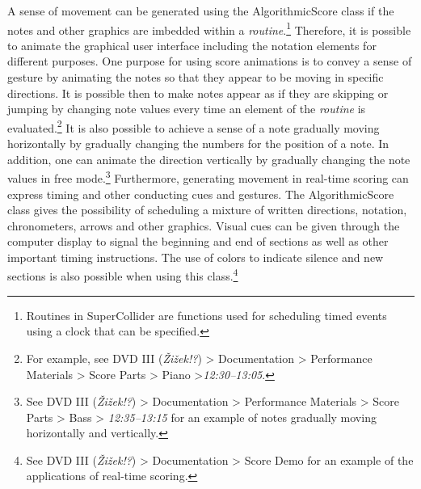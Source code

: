 \hypertarget{algoanimation}{}
A sense of movement can be generated using the AlgorithmicScore class if the notes and other graphics are imbedded within a \emph{routine}.\footnote{Routines in SuperCollider are functions used for scheduling timed events using a clock that can be specified.} Therefore, it is possible to animate the graphical user interface including the notation elements for different purposes. One purpose for using score animations is to convey a sense of gesture by animating the notes so that they appear to be moving in specific directions. It is possible then to make notes appear as if they are skipping or jumping by changing note values every time an element of the \emph{routine} is evaluated.\footnote{For example, see DVD III (\emph{\v{Z}i\v{z}ek!?}) \tiny \textgreater \footnotesize \hspace{0pt} Documentation \tiny \textgreater \footnotesize \hspace{0pt} Performance Materials \tiny \textgreater \footnotesize \hspace{0pt} Score Parts \tiny \textgreater \footnotesize \hspace{0pt} Piano \tiny \textgreater \footnotesize \hspace{0pt}\mbox{\emph{12:30--13:05}}.} It is also possible to achieve a sense of a note gradually moving horizontally by gradually changing the numbers for the position of a note. In addition, one can animate the direction vertically by gradually changing the note values in free mode.\footnote{See DVD III (\emph{\v{Z}i\v{z}ek!?}) \tiny \textgreater \footnotesize \hspace{0pt} Documentation \tiny \textgreater \footnotesize \hspace{0pt} Performance Materials \tiny \textgreater \footnotesize \hspace{0pt} Score Parts \tiny \textgreater \footnotesize \hspace{0pt} Bass \tiny \textgreater \footnotesize \hspace{0pt} \mbox{\emph{12:35--13:15}} for an example of notes gradually moving horizontally and vertically.} Furthermore, generating movement in real-time scoring can express timing and other conducting cues and gestures. The AlgorithmicScore class gives the possibility of scheduling a mixture of written directions, notation, chronometers, arrows and other graphics.  Visual cues can be given through the computer display to signal the beginning and end of sections as well as other important timing instructions. The use of colors to indicate silence and new sections is also possible when using this class.\footnote{See DVD III (\emph{\v{Z}i\v{z}ek!?}) \tiny \textgreater \footnotesize \hspace{0pt} Documentation \tiny \textgreater \footnotesize \hspace{0pt} Score Demo for an example of the applications of real-time scoring.} 

